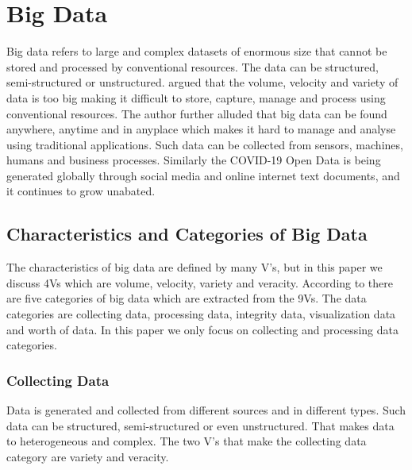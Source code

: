 \documentclass[12pt,letterpaper, twoside]{article}
\begin{document}
\section{Big Data}
Big data refers to large and complex datasets of enormous size that cannot be stored and processed by conventional resources\cite{Grolinger}. The data can be structured, semi-structured or unstructured. \cite{Owais} argued that the volume, velocity and variety of data is too big making it difficult to store, capture, manage and process using conventional resources. The author further alluded that big data can be found anywhere, anytime and in anyplace which makes it hard to manage and analyse using traditional applications\cite{Owais}. Such data can be collected from sensors, machines, humans and business processes. Similarly the COVID-19 Open Data is being generated globally through social media and online internet text documents, and  it continues to grow unabated. 

\subsection{Characteristics and Categories of Big Data}
The characteristics of big data are defined by many V's, but in this paper we discuss 4Vs which are volume, velocity, variety and veracity. According to \cite{Owais} there are five categories of big data which are extracted from the 9Vs. The data categories are collecting data, processing data, integrity data, visualization data and worth of data.  In this paper we only focus on collecting and processing data categories. 

\subsubsection{Collecting Data}
Data is generated and collected from different sources and in different types.  Such data can be structured, semi-structured or even unstructured. That makes data to heterogeneous and complex. The two V's that make the collecting data category are variety and veracity. 
\end{document}
